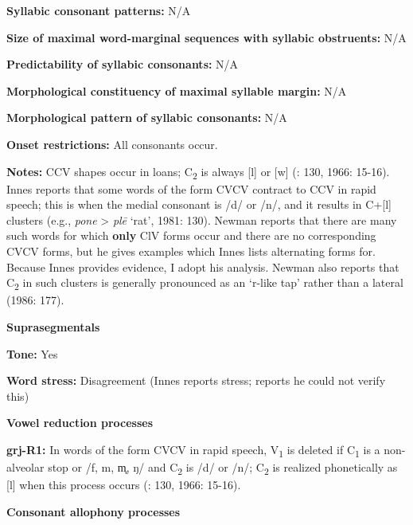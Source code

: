 \textbf{Syllabic consonant patterns:} N/A



\textbf{Size of maximal word{}-marginal sequences with syllabic obstruents:} N/A



\textbf{Predictability of syllabic consonants:} N/A



\textbf{Morphological constituency of maximal syllable margin:} N/A



\textbf{Morphological pattern of syllabic consonants:} N/A



\textbf{Onset restrictions:} All consonants occur.



\textbf{Notes:} CCV shapes occur in loans; C\textsubscript{2} is always [l] or [w] (\citealt{Innes1981}: 130, 1966: 15-16). Innes reports that some words of the form CVCV contract to CCV in rapid speech; this is when the medial consonant is /d/ or /n/, and it results in C+[l] clusters (e.g., \textit{pone} > \textit{plē} ‘rat’, 1981: 130). Newman reports that there are many such words for which \textbf{only} ClV forms occur and there are no corresponding CVCV forms, but he gives examples which Innes lists alternating forms for. Because Innes provides evidence, I adopt his analysis. Newman also reports that C\textsubscript{2} in such clusters is generally pronounced as an ‘r-like tap’ rather than a lateral (1986: 177).



\textbf{Suprasegmentals}



\textbf{Tone:} Yes



\textbf{Word stress:} Disagreement (Innes reports stress; \citealt{Newman1986} reports he could not verify this)



\textbf{Vowel reduction processes}



\textbf{grj-R1:} In words of the form CVCV in rapid speech, V\textsubscript{1} is deleted if C\textsubscript{1} is a non-alveolar stop or /f, m, m̥, ŋ/ and C\textsubscript{2} is /d/ or /n/; C\textsubscript{2} is realized phonetically as [l] when this process occurs (\citealt{Innes1981}: 130, 1966: 15-16).



\textbf{Consonant allophony processes}



